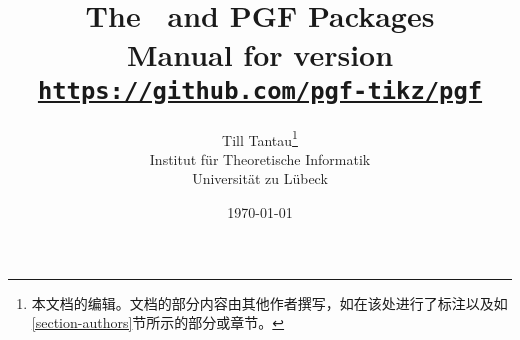 \documentclass{ltxdoc}
\begin{document}



\title{\bfseries The \tikzname\ and {\Large PGF} Packages\\
  \large Manual for version \pgfversion\\[1mm]
\large\href{https://github.com/pgf-tikz/pgf}{\texttt{https://github.com/pgf-tikz/pgf}}}
\author{Till Tantau\footnote{本文档的编辑。文档的部分内容由其他作者撰写，如在该处进行了标注以及如\ref{section-authors}节所示的部分或章节。}\\
  \normalsize Institut für Theoretische Informatik\\[-1mm]
  \normalsize Universität zu Lübeck}
\date{\today}

\maketitle

\tableofcontents

\clearpage



% 
% 
% 
% 
% 
% 
% 
% 
% 
% 
    
\end{document}
